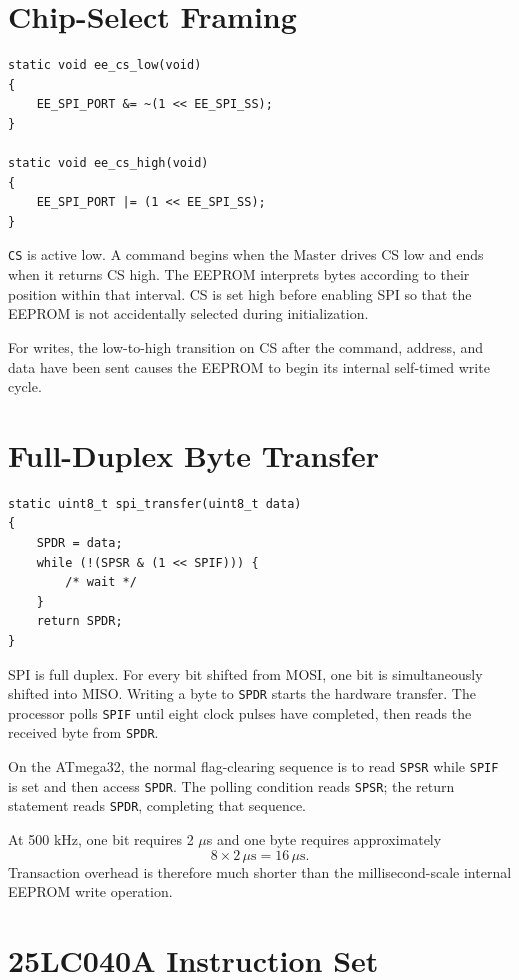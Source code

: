 \documentclass[11pt,a4paper]{article}
\begin{document}
\section{Chip-Select Framing}

\begin{lstlisting}[style=cstyle]
static void ee_cs_low(void)
{
    EE_SPI_PORT &= ~(1 << EE_SPI_SS);
}

static void ee_cs_high(void)
{
    EE_SPI_PORT |= (1 << EE_SPI_SS);
}
\end{lstlisting}

\texttt{CS} is active low. A command begins when the Master drives CS low and ends when it returns CS high. The EEPROM interprets bytes according to their position within that interval. CS is set high before enabling SPI so that the EEPROM is not accidentally selected during initialization.

For writes, the low-to-high transition on CS after the command, address, and data have been sent causes the EEPROM to begin its internal self-timed write cycle.

\section{Full-Duplex Byte Transfer}

\begin{lstlisting}[style=cstyle,caption={Hardware SPI byte transfer.}]
static uint8_t spi_transfer(uint8_t data)
{
    SPDR = data;
    while (!(SPSR & (1 << SPIF))) {
        /* wait */
    }
    return SPDR;
}
\end{lstlisting}

SPI is full duplex. For every bit shifted from MOSI, one bit is simultaneously shifted into MISO. Writing a byte to \texttt{SPDR} starts the hardware transfer. The processor polls \texttt{SPIF} until eight clock pulses have completed, then reads the received byte from \texttt{SPDR}.

On the ATmega32, the normal flag-clearing sequence is to read \texttt{SPSR} while \texttt{SPIF} is set and then access \texttt{SPDR}. The polling condition reads \texttt{SPSR}; the return statement reads \texttt{SPDR}, completing that sequence.

At 500 kHz, one bit requires 2 $\mu$s and one byte requires approximately
\[
8\times2\,\mu\text{s}=16\,\mu\text{s}.
\]
Transaction overhead is therefore much shorter than the millisecond-scale internal EEPROM write operation.

\section{25LC040A Instruction Set}
\end{document}
